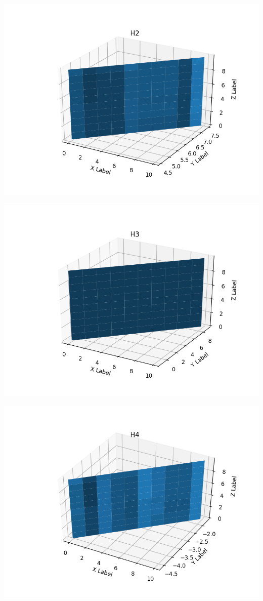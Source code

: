 \documentclass[paper=a4, fontsize=11pt]{scrartcl}
\numberwithin{equation}{section}		%
\numberwithin{figure}{section}			%
\numberwithin{table}{section}				%
\begin{document}
\begin{enumerate}
    \includegraphics[scale=0.4]{H2}
    
    \includegraphics[scale=0.4]{H3}
    
    \includegraphics[scale=0.4]{H4}
    

\end{enumerate}
\end{document}
